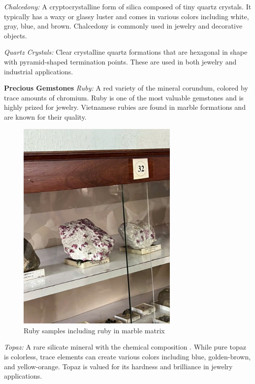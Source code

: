\textit{Chalcedony:} A cryptocrystalline form of silica composed of tiny quartz crystals. It typically has a waxy or glassy luster and comes in various colors including white, gray, blue, and brown. Chalcedony is commonly used in jewelry and decorative objects.



\textit{Quartz Crystals:} Clear crystalline quartz formations that are hexagonal in shape with pyramid-shaped termination points. These are used in both jewelry and industrial applications.



\textbf{Precious Gemstones}
\textit{Ruby:} A red variety of the mineral corundum, colored by trace amounts of chromium. Ruby is one of the most valuable gemstones and is highly prized for jewelry. Vietnamese rubies are found in marble formations and are known for their quality.

\begin{figure}[H]
\centering
\includegraphics[width=0.7\textwidth]{graphics/ruby.png}
\caption{Ruby samples including ruby in marble matrix}
\label{fig:ruby}
\end{figure}

\textit{Topaz:} A rare silicate mineral with the chemical composition . While pure topaz is colorless, trace elements can create various colors including blue, golden-brown, and yellow-orange. Topaz is valued for its hardness and brilliance in jewelry applications.

